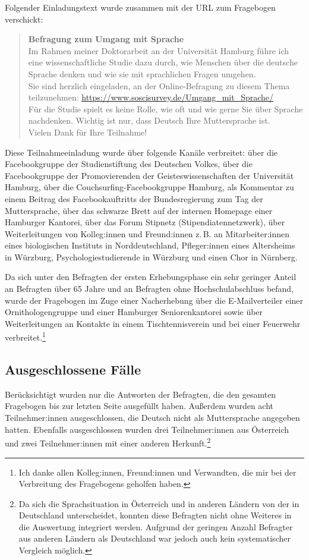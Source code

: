 Folgender Einladungstext wurde zusammen mit der URL zum Fragebogen verschickt: 
\begin{quote}
\textbf{Befragung zum Umgang mit Sprache}\\
Im Rahmen meiner Doktorarbeit an der Universität Hamburg führe ich eine wissenschaftliche Studie dazu durch, wie Menschen über die deutsche Sprache denken und wie sie mit sprachlichen Fragen umgehen.\\
Sie sind herzlich eingeladen, an der Online-Befragung zu diesem Thema teilzunehmen: \url{https://www.soscisurvey.de/Umgang\_mit\_Sprache/} \\
Für die Studie spielt es keine Rolle, wie oft und wie gerne Sie über Sprache nachdenken. Wichtig ist nur, dass Deutsch Ihre Muttersprache ist. \\
Vielen Dank für Ihre Teilnahme!
\end{quote}
Diese Teilnahmeeinladung wurde über folgende Kanäle verbreitet: über die Facebookgruppe der Studienstiftung des Deutschen Volkes, über die Facebookgruppe der Promovierenden der Geisteswissenschaften der Universität Hamburg, über die Couchsurfing-Facebookgruppe Hamburg, als Kommentar zu einem Beitrag des Facebookauftritts der Bundesregierung zum Tag der Muttersprache, über das schwarze Brett auf der internen Homepage einer Hamburger Kantorei, über das Forum Stipnetz (Stipendiatennetzwerk), über Weiterleitungen von Kolleg:innen und Freund:innen z.\,B. an Mitarbeiter:innen eines biologischen Instituts in Norddeutschland, Pfleger:innen eines Altersheims in Würzburg, Psychologiestudierende in Würzburg und einen Chor in Nürnberg. 

Da sich unter den Befragten der ersten Erhebungsphase ein sehr geringer Anteil an Befragten über 65 Jahre und an Befragten ohne Hochschulabschluss befand, wurde der Fragebogen im Zuge einer Nacherhebung über die E\hyp Mailverteiler einer Ornithologengruppe und einer Hamburger Seniorenkantorei sowie über Weiterleitungen an Kontakte in einem Tischtennisverein und bei einer Feuerwehr verbreitet.\footnote{Ich danke allen Kolleg:innen, Freund:innen und Verwandten, die mir bei der Verbreitung des Fragebogens geholfen haben.}

\subsection{Ausgeschlossene Fälle}
\label{sec:Ausschluss}
Berücksichtigt wurden nur die Antworten der Befragten, die den gesamten Fragebogen bis zur letzten Seite ausgefüllt haben. 
Außerdem wurden acht Teilnehmer:innen ausgeschlossen, die Deutsch nicht als Muttersprache angegeben hatten.
Ebenfalls ausgeschlossen wurden drei Teilnehmer:innen aus Österreich und zwei Teilnehmer:innen mit einer anderen Herkunft.\footnote{Da sich die Sprachsituation in Österreich und in anderen Ländern von der in Deutschland unterscheidet, konnten diese Befragten nicht ohne Weiteres in die Auswertung integriert werden. Aufgrund der geringen Anzahl Befragter aus anderen Ländern als Deutschland war jedoch auch kein systematischer Vergleich möglich.} 

